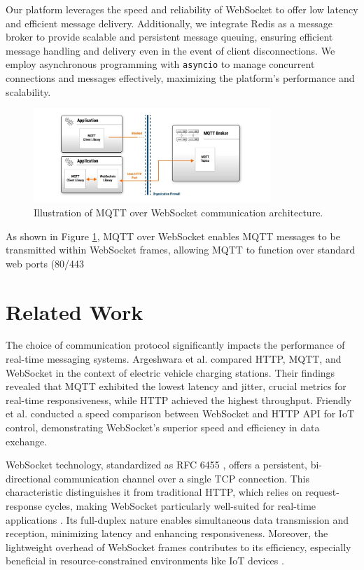 \documentclass[a4paper, 11pt]{article}
\begin{document}
Our platform leverages the speed and reliability of WebSocket to offer low latency and efficient message delivery. Additionally, we integrate Redis as a message broker to provide scalable and persistent message queuing, ensuring efficient message handling and delivery even in the event of client disconnections. We employ asynchronous programming with \texttt{asyncio} to manage concurrent connections and messages effectively, maximizing the platform's performance and scalability. 

\begin{figure}
    \centering
    \includegraphics[width=0.8\textwidth]{webscoket_mqtt.jpg}
    \caption{Illustration of MQTT over WebSocket communication architecture.}
    \label{fig:mqtt_over_websocket}
\end{figure}

As shown in Figure \ref{fig:mqtt_over_websocket}, MQTT over WebSocket enables MQTT messages to be transmitted within WebSocket frames, allowing MQTT to function over standard web ports (80/443

\section{Related Work}

The choice of communication protocol significantly impacts the performance of real-time messaging systems. Argeshwara et al. \cite{argeshwara2024} compared HTTP, MQTT, and WebSocket in the context of electric vehicle charging stations. Their findings revealed that MQTT exhibited the lowest latency and jitter, crucial metrics for real-time responsiveness, while HTTP achieved the highest throughput. Friendly et al. \cite{friendly2022} conducted a speed comparison between WebSocket and HTTP API for IoT control, demonstrating WebSocket's superior speed and efficiency in data exchange.

WebSocket technology, standardized as RFC 6455 \cite{rfc6455}, offers a persistent, bi-directional communication channel over a single TCP connection. This characteristic distinguishes it from traditional HTTP, which relies on request-response cycles, making WebSocket particularly well-suited for real-time applications \cite{lubbers2013, hoffman2012}. Its full-duplex nature enables simultaneous data transmission and reception, minimizing latency and enhancing responsiveness. Moreover, the lightweight overhead of WebSocket frames contributes to its efficiency, especially beneficial in resource-constrained environments like IoT devices \cite{barnes2018}.
\end{document}
